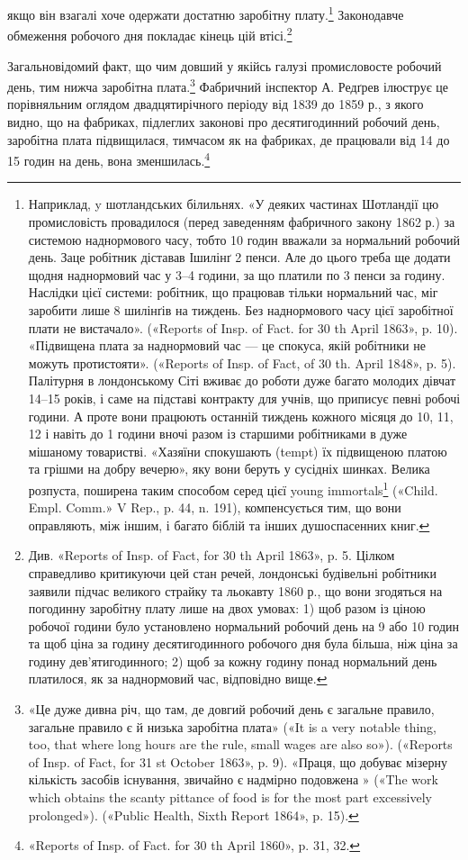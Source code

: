 якщо він взагалі хоче одержати достатню заробітну плату.\footnote{
Наприклад, y шотландських білильнях. «У деяких частинах
Шотландії цю промисловість провадилося (перед заведенням фабричного
закону 1862 р.) за системою наднормового часу, тобто 10 годин вважали
за нормальний робочий день. Заце робітник діставав Ішилінґ 2 пенси.
Але до цього треба ще додати щодня наднормовий час у 3--4 години,
за що платили по 3 пенси за годину. Наслідки цієї системи: робітник,
що працював тільки нормальний час, міг заробити лише 8 шилінґів на
тиждень. Без наднормового часу цієї заробітної плати не вистачало».
(«Reports of Insp. of Fact. for 30 th April 1863», p. 10). «Підвищена плата
за наднормовий час — це спокуса, якій робітники не можуть протистояти».
(«Reports of Insp. of Fact, of 30 th. April 1848», p. 5). Палітурня
в лондонському Сіті вживає до роботи дуже багато молодих дівчат
14--15 років, і саме на підставі контракту для учнів, що приписує певні
робочі години. А проте вони працюють останній тиждень кожного місяця
до 10, 11, 12 і навіть до 1 години вночі разом із старшими робітниками
в дуже мішаному товаристві. «Хазяїни спокушають (tempt) їх підвищеною
платою та грішми на добру вечерю», яку вони беруть у сусідніх
шинках. Велика розпуста, поширена таким способом серед цієї
young immortals\footnote*{
— безсмертної молоді. \emph{Ред.}
} («Child. Empl. Comm.» V Rep., p. 44, n. 191), компенсується
тим, що вони оправляють, між іншим, і багато біблій та інших
душоспасенних книг.
}
Законодавче обмеження робочого дня покладає кінець цій втісі.\footnote{
Див. «Reports of Insp. of Fact, for 30 th April 1863», p. 5. Цілком
справедливо критикуючи цей стан речей, лондонські будівельні робітники
заявили підчас великого страйку та льокавту 1860 р., що вони згодяться
на погодинну заробітну плату лише на двох умовах: 1) щоб разом
із ціною робочої години було установлено нормальний робочий день на
9 або 10 годин та щоб ціна за годину десятигодинного робочого дня була
більша, ніж ціна за годину дев’ятигодинного; 2) щоб за кожну годину
понад нормальний день платилося, як за наднормовий час, відповідно вище.
}

Загальновідомий факт, що чим довший у якійсь галузі промисловосте
робочий день, тим нижча заробітна плата.\footnote{
«Це дуже дивна річ, що там, де довгий робочий день є загальне
правило, загальне правило є й низька заробітна плата» («It is a very
notable thing, too, that where long hours are the rule, small wages are also
so»). («Reports of Insp. of Fact, for 31 st October 1863», p. 9). «Праця, що
добуває мізерну кількість засобів існування, звичайно є надмірно подовжена
» («The work which obtains the scanty pittance of food is for the most
part excessively prolonged»). («Public Health, Sixth Report 1864», p. 15).
} Фабричний
інспектор А. Редґрев ілюструє це порівняльним оглядом
двадцятирічного періоду від 1839 до 1859 р., з якого видно, що
на фабриках, підлеглих законові про десятигодинний робочий
день, заробітна плата підвищилася, тимчасом як на фабриках,
де працювали від 14 до 15 годин на день, вона зменшилась.\footnote{
«Reports of Insp. of Fact. for 30 th April 1860», p. 31, 32.
}

